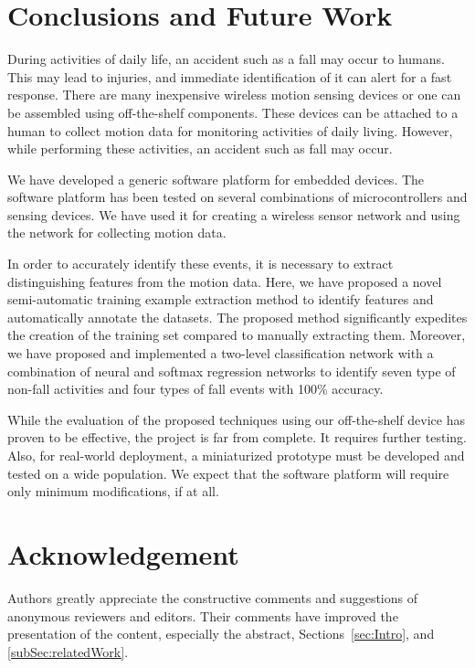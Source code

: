 \documentclass[]{IEEEtran}
\begin{document}
\section{Conclusions and Future Work}
  
During activities of daily life, an accident such as a fall may occur to
humans. This may lead to injuries, and immediate identification of it can alert
for a fast response.  There are many inexpensive wireless motion sensing
devices or one can be assembled using off-the-shelf components. These devices
can be attached to a human to collect motion data for monitoring activities of
daily living. However, while performing these activities, an accident such as
fall may occur.

We have developed a generic software platform for embedded devices. The
software platform has been tested on several combinations of microcontrollers
and sensing devices. We have used it for creating a wireless sensor network and
using the network for collecting motion data.

In order to accurately identify these events, it is necessary to extract
distinguishing features from the motion data. Here, we have proposed a novel
semi-automatic training example extraction method to identify features and
automatically annotate the datasets. The proposed method significantly
expedites the creation of the training set compared to manually extracting
them. Moreover, we have proposed and implemented a two-level classification
network with  a combination of neural and softmax regression networks to
identify seven type of non-fall activities and four types of fall events with
100\% accuracy. 

While the evaluation of the proposed techniques using our off-the-shelf device
has proven to be effective, the project is far from complete. It requires
further testing. Also, for real-world deployment, a miniaturized prototype must
be developed and tested on a wide population. We expect that the software
platform will require only minimum modifications, if at all.

\section*{Acknowledgement} \label{sec:Acknowledgement} Authors greatly
appreciate the constructive comments and suggestions of anonymous reviewers and editors. Their
comments have improved the presentation of the content, especially the abstract, Sections~\ref{sec:Intro}, and \ref{subSec:relatedWork}.




\end{document}
